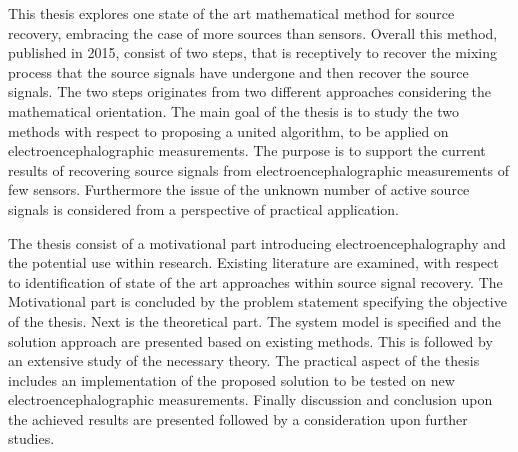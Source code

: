 This thesis explores one state of the art mathematical method for source recovery, embracing the case of more sources than sensors. 
Overall this method, published in 2015, consist of two steps, that is receptively to recover the mixing process that the source signals have undergone and then recover the source signals.
The two steps originates from two different approaches considering the mathematical orientation. 
The main goal of the thesis is to study the two methods with respect to proposing a united algorithm, to be applied on electroencephalographic measurements. The purpose is to support the current results of recovering source signals from electroencephalographic measurements of few sensors. Furthermore the issue of the unknown number of active source signals is considered from a perspective of practical application.      

The thesis consist of a motivational part introducing  electroencephalography and the potential use within research. Existing literature are examined, with respect to identification of state of the art approaches within source signal recovery. The Motivational part is concluded by the problem statement specifying the objective of the thesis.
Next is the theoretical part. The system model is specified and the solution approach are presented based on existing methods. This is followed by an extensive study of the necessary theory.   
The practical aspect of the thesis includes an implementation of the proposed solution to be tested on new electroencephalographic measurements. 
Finally discussion and conclusion upon the achieved results are presented followed by a consideration upon further studies.    
      





              


